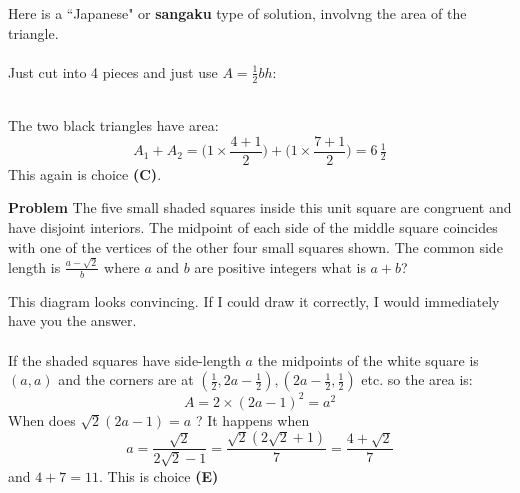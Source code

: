 \documentclass[12pt]{article}
\begin{document}
\newpage

\noindent Here is a ``Japanese" or \textbf{sangaku} type of solution, involvng the area of the triangle. \\ \\
Just cut into 4 pieces and just use $A = \frac{1}{2}bh$:\\
 \\
The two black triangles have area:
$$ A_1 + A_2 = \bigg(1 \times \frac{4+1}{2} \bigg)+ \bigg(1 \times \frac{7+1}{2} \bigg) = 6 \,\tfrac{1}{2}$$
This again is choice \textbf{(C)}. \newpage

\noindent \textbf{Problem} The five small shaded squares inside this unit square are congruent and have disjoint interiors.  The midpoint of each side of the middle square coincides with one of the vertices of the other four small squares shown.  The common side length is $\frac{a - \sqrt{2}}{b}$ where $a$ and $b$ are positive integers what is $a+b$?\\

This diagram looks convincing.  If I could draw it correctly, I would immediately have you the answer. \\ \\ If the shaded squares have side-length $a$ the midpoints of the white square is $(a,a)$ and the corners are at $( \frac{1}{2}, 2a - \frac{1}{2}), (2a - \frac{1}{2} , \frac{1}{2}) $ etc. so the area is:
$$ A = 2 \times (2a-1)^2  = a^2 $$
When does $\sqrt{2}(2a-1)=a$ ? It happens when 
$$ a = \frac{\sqrt{2}}{2 \sqrt{2}-1}= \frac{\sqrt{2}(2\sqrt{2}+1)}{7} = \frac{4 + \sqrt{2}}{7}$$
and $\boxed{4+7=11}$.  This is choice \textbf{(E)}
\end{document}
